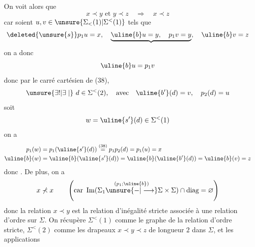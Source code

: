 On voit alors que
\[
x\prec y\text{ et }y\prec z\quad\Longrightarrow\quad x\prec z
\]
car soient $u,v\in\unsure{\Sigma_{<}(1)|\Sigma^{<}(1)}$ tels que
\[
\deleted{\unsure{s}}p_1u=x,\quad\underbrace{\uline{b}u=y,\quad p_1v=y},\quad\uline{b}v=z
\]
on a donc
\[
\uline{b}u=p_1v
\]
donc par le carré cartésien de (38), 
\[
\unsure{\exists!|\exists\mid}\ d\in\Sigma^{<}(2),\quad\text{avec}\quad\uline{b'}(d)=v,\quad p_2(d)=u
\]
soit
\[
w=\uline{s'}(d)\in\Sigma^{<}(1)
\]
on a
\[
\begin{aligned}
p_1(w)&=p_1(\uline{s'}(d))\overset{(38)}{=}p_1p_2(d)=p_1(u)=x\\
\uline{b}(w)&=\uline{b}(\uline{s'}(d))=\uline{b}(\uline{b'}(d))=\uline{b}(v)=z
\end{aligned}
\]
donc
.
De plus, on a
\[
x\not\prec x\qquad\left(\text{car }\operatorname{Im}(\Sigma_1\overset{(p_1;\uline{b})}{\unsure{-|\longrightarrow}}\Sigma\times\Sigma)\cap\text{diag}=\varnothing\right)
\]
donc la relation $x\prec y$ est la relation
d'inégalité stricte associée à une relation
d'ordre sur $\Sigma$. On récupère $\Sigma^{<}(1)$ comme
le graphe de la relation d'ordre stricte,
$\Sigma^{<}(2)$ comme les drapeaux $x\prec y\prec z$ de
longueur $2$ dans $\Sigma$, et les applications
